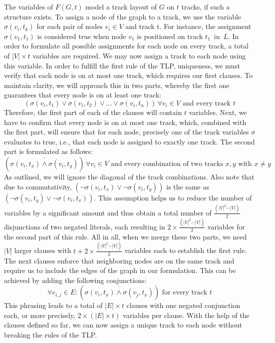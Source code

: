 \documentclass[bachelor, english]{algothesis}
\begin{document}
\noindent
The variables of $F(G, t)$ model a track layout of $G$ on $t$ tracks, if such a structure exists. To assign a node of the graph to a track, we use the variable $\sigma(v_i,t_k)$ for each pair of nodes $v_i \in V$ and track t. For instance, the assignment $\sigma(v_1, t_1)$ is considered true when node $v_1$ is positioned on track $t_1 \,$ in $\, L$. In order to formulate all possible assignments for each node on every track, a total of $ \vert V \vert \times t$ variables are required. We may now assign a track to each node using this variable. In order to fulfill the first rule of the TLP, uniqueness, we must verify that each node is on at most one track, which requires our first clauses. To maintain clarity, we will approach this in two parts, whereby the first one guarantees that every node is on at least one track:
    $$ (\sigma(v_i,t_1) \lor \sigma(v_i,t_2) \lor \dots \lor \sigma(v_i,t_n)) \, \forall v_i \in V \text{ and every track }t $$ 
Therefore, the first part of each of the clauses will contain $t$ variables. Next, we have to confirm that every node is on at most one track, which, combined with the first part, will ensure that for each node, precisely one of the track variables $\sigma$ evaluates to true, i.e., that each node is assigned to exactly one track. The second part is formulated as follows:
    $$ (\overline{\sigma(v_i, t_x) \land \sigma(v_i, t_y)}) \, \forall v_i \in V \text{ and every combination of two tracks } x, y \text{ with } x \neq y$$ 
\noindent
As outlined, we will ignore the diagonal of the track combinations. Also note that due to commutativity, $(\lnot \sigma(v_i, t_x) \lor \lnot \sigma(v_i, t_y))$ is the same as $(\lnot \sigma(v_i, t_y) \lor \lnot \sigma(v_i, t_x))$. This assumption helps us to reduce the number of variables by a significant amount and thus obtain a total number of $\frac{(\vert V \vert^2-\vert V \vert)}{2}$ disjunctions of two negated literals, each resulting in $2 \times \frac{(\vert V \vert^2-\vert V \vert)}{2}$ variables for the second part of this rule. All in all, when we merge these two parts, we need $\vert V \vert$ larger clauses with $t + 2 \times \frac{(\vert V \vert^2-\vert V \vert)}{2}$ variables each to establish the first rule. The next clauses enforce that neighboring nodes are on the same track and require us to include the edges of the graph in our formulation. This can be achieved by adding the following conjunctions:
        $$ \forall e_{i,j} \in E : (\overline{\sigma(v_i,t_x) \land \sigma(v_j,t_x)}) \text{ for every track } t $$ 
This phrasing leads to a total of $\vert E \vert \times t$ clauses with one negated conjunction each, or more precisely, $2 \times (\vert E \vert \times t)$ variables per clause. With the help of the clauses defined so far, we can now assign a unique track to each node without breaking the rules of the TLP. 
\end{document}
